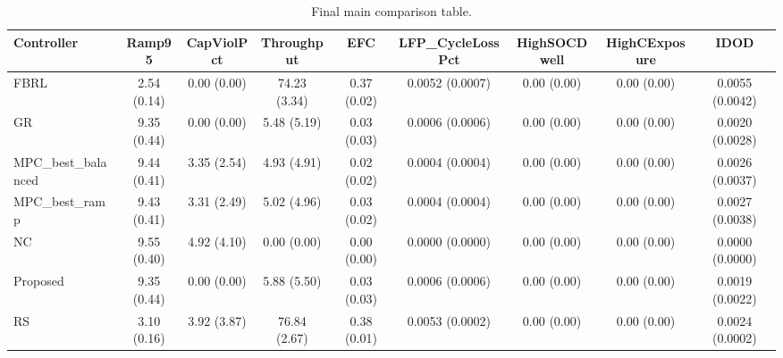 \begin{table}[t]
\centering
\caption{Final main comparison table.}
\label{tab:results_final_auto}
\begin{tabular}{lcccccccc}
\toprule
Controller & Ramp95 & CapViolPct & Throughput & EFC & LFP\_CycleLossPct & HighSOCDwell & HighCExposure & IDOD \\
\midrule
FBRL & 2.54 (0.14) & 0.00 (0.00) & 74.23 (3.34) & 0.37 (0.02) & 0.0052 (0.0007) & 0.00 (0.00) & 0.00 (0.00) & 0.0055 (0.0042) \\
GR & 9.35 (0.44) & 0.00 (0.00) & 5.48 (5.19) & 0.03 (0.03) & 0.0006 (0.0006) & 0.00 (0.00) & 0.00 (0.00) & 0.0020 (0.0028) \\
MPC\_best\_balanced & 9.44 (0.41) & 3.35 (2.54) & 4.93 (4.91) & 0.02 (0.02) & 0.0004 (0.0004) & 0.00 (0.00) & 0.00 (0.00) & 0.0026 (0.0037) \\
MPC\_best\_ramp & 9.43 (0.41) & 3.31 (2.49) & 5.02 (4.96) & 0.03 (0.02) & 0.0004 (0.0004) & 0.00 (0.00) & 0.00 (0.00) & 0.0027 (0.0038) \\
NC & 9.55 (0.40) & 4.92 (4.10) & 0.00 (0.00) & 0.00 (0.00) & 0.0000 (0.0000) & 0.00 (0.00) & 0.00 (0.00) & 0.0000 (0.0000) \\
Proposed & 9.35 (0.44) & 0.00 (0.00) & 5.88 (5.50) & 0.03 (0.03) & 0.0006 (0.0006) & 0.00 (0.00) & 0.00 (0.00) & 0.0019 (0.0022) \\
RS & 3.10 (0.16) & 3.92 (3.87) & 76.84 (2.67) & 0.38 (0.01) & 0.0053 (0.0002) & 0.00 (0.00) & 0.00 (0.00) & 0.0024 (0.0002) \\
\bottomrule
\end{tabular}
\end{table}